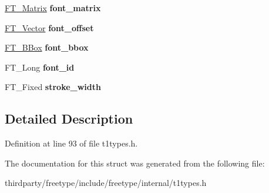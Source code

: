 \begin{DoxyCompactItemize}
$$\hyperlink{struct_f_t___matrix__}{F\+T\+\_\+\+Matrix} {\bfseries font\+\_\+matrix}
\item 
\mbox{\label{struct_t1___font_rec___ab6e773e20df1c585dc14ee3fa7ed1737}} 
\hyperlink{struct_f_t___vector__}{F\+T\+\_\+\+Vector} {\bfseries font\+\_\+offset}
\item 
\mbox{\label{struct_t1___font_rec___a86fd1af4c03e34b7d151054ccc7525a7}} 
\hyperlink{struct_f_t___b_box__}{F\+T\+\_\+\+B\+Box} {\bfseries font\+\_\+bbox}
\item 
\mbox{\label{struct_t1___font_rec___a14178cf438d1a5fcb31b7d398d06cfaf}} 
F\+T\+\_\+\+Long {\bfseries font\+\_\+id}
\item 
\mbox{\label{struct_t1___font_rec___ac71ace1872be6b2adbd3d6f5ca456d23}} 
F\+T\+\_\+\+Fixed {\bfseries stroke\+\_\+width}
\end{DoxyCompactItemize}


\subsection{Detailed Description}


Definition at line 93 of file t1types.\+h.



The documentation for this struct was generated from the following file\+:\begin{DoxyCompactItemize}
\item 
thirdparty/freetype/include/freetype/internal/t1types.\+h\end{DoxyCompactItemize}
